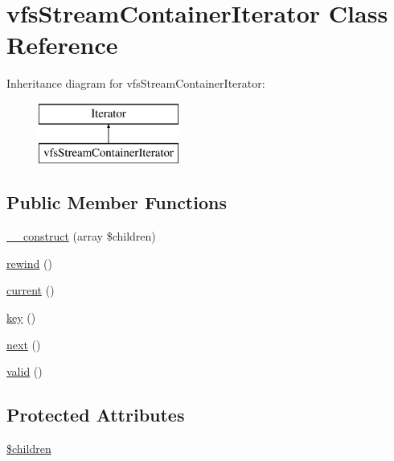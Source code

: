 \hypertarget{classorg_1_1bovigo_1_1vfs_1_1vfs_stream_container_iterator}{}\section{vfs\+Stream\+Container\+Iterator Class Reference}
\label{classorg_1_1bovigo_1_1vfs_1_1vfs_stream_container_iterator}
Inheritance diagram for vfs\+Stream\+Container\+Iterator\+:\begin{figure}[H]
\begin{center}
\leavevmode
\includegraphics[height=2.000000cm]{classorg_1_1bovigo_1_1vfs_1_1vfs_stream_container_iterator}
\end{center}
\end{figure}
\subsection*{Public Member Functions}
\begin{DoxyCompactItemize}
\item 
\mbox{\hyperlink{classorg_1_1bovigo_1_1vfs_1_1vfs_stream_container_iterator_a58cb0bc3e02d464008a6409edee31a1c}{\+\_\+\+\_\+construct}} (array \$children)
\item 
\mbox{\hyperlink{classorg_1_1bovigo_1_1vfs_1_1vfs_stream_container_iterator_ae619dcf2218c21549cb65d875bbc6c9c}{rewind}} ()
\item 
\mbox{\hyperlink{classorg_1_1bovigo_1_1vfs_1_1vfs_stream_container_iterator_af343507d1926e6ecf964625d41db528c}{current}} ()
\item 
\mbox{\hyperlink{classorg_1_1bovigo_1_1vfs_1_1vfs_stream_container_iterator_a729e946b4ef600e71740113c6d4332c0}{key}} ()
\item 
\mbox{\hyperlink{classorg_1_1bovigo_1_1vfs_1_1vfs_stream_container_iterator_acea62048bfee7b3cd80ed446c86fb78a}{next}} ()
\item 
\mbox{\hyperlink{classorg_1_1bovigo_1_1vfs_1_1vfs_stream_container_iterator_abb9f0d6adf1eb9b3b55712056861a247}{valid}} ()
\end{DoxyCompactItemize}
\subsection*{Protected Attributes}
\begin{DoxyCompactItemize}
\item 
\mbox{\hyperlink{classorg_1_1bovigo_1_1vfs_1_1vfs_stream_container_iterator_aafda1a84fe840800c9884c167093f759}{\$children}}
\end{DoxyCompactItemize}


